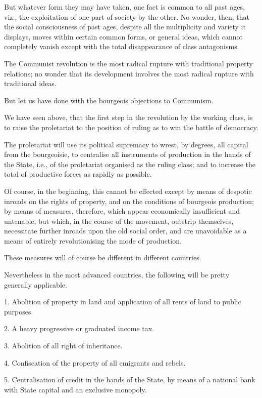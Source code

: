 \documentclass[11pt]{book}
\begin{document}
But whatever form they may have taken, one fact is common to all
past ages, viz., the exploitation of one part of society by the
other. No wonder, then, that the social consciousness of past
ages, despite all the multiplicity and variety it displays,
moves within certain common forms, or general ideas, which
cannot completely vanish except with the total disappearance of
class antagonisms.

The Communist revolution is the most radical rupture with
traditional property relations; no wonder that its development
involves the most radical rupture with traditional ideas.

But let us have done with the bourgeois objections to Communism.

We have seen above, that the first step in the revolution by the
working class, is to raise the proletariat to the position of
ruling as to win the battle of democracy.

The proletariat will use its political supremacy to wrest, by
degrees, all capital from the bourgeoisie, to centralise all
instruments of production in the hands of the State, i.e., of the
proletariat organised as the ruling class; and to increase the
total of productive forces as rapidly as possible.

Of course, in the beginning, this cannot be effected except by
means of despotic inroads on the rights of property, and on
the conditions of bourgeois production; by means of measures,
therefore, which appear economically insufficient and untenable,
but which, in the course of the movement, outstrip themselves,
necessitate further inroads upon the old social order, and are
unavoidable as a means of entirely revolutionising the mode of
production.

These measures will of course be different in different
countries.

Nevertheless in the most advanced countries, the following will
be pretty generally applicable.

1.  Abolition of property in land and application of all rents
    of land to public purposes.

2.  A heavy progressive or graduated income tax.

3.  Abolition of all right of inheritance.

4.  Confiscation of the property of all emigrants and rebels.

5.  Centralisation of credit in the hands of the State, by means
    of a national bank with State capital and an exclusive
    monopoly.
\end{document}

